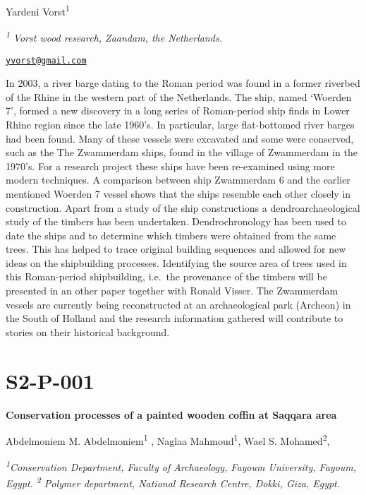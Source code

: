 \documentclass[
]{book}
\begin{document}
Yardeni Vorst\textsuperscript{1}

\textsuperscript{\emph{1}} \emph{Vorst wood research, Zaandam, the Netherlands.}

\href{mailto:yvorst@gmail.com}{\nolinkurl{yvorst@gmail.com}}

In 2003, a river barge dating to the Roman period was found in a former riverbed of the Rhine in the western part of the Netherlands. The ship, named `Woerden 7', formed a new discovery in a long series of Roman-period ship finds in Lower Rhine region since the late 1960's. In particular, large flat-bottomed river barges had been found. Many of these vessels were excavated and some were conserved, such as the The Zwammerdam ships, found in the village of Zwammerdam in the 1970's. For a research project these ships have been re-examined using more modern techniques. A comparison between ship Zwammerdam 6 and the earlier mentioned Woerden 7 vessel shows that the ships resemble each other closely in construction. Apart from a study of the ship constructions a dendroarchaeological study of the timbers has been undertaken. Dendrochronology has been used to date the ships and to determine which timbers were obtained from the same trees. This has helped to trace original building sequences and allowed for new ideas on the shipbuilding processes. Identifying the source area of trees used in this Roman-period shipbuilding, i.e.~the provenance of the timbers will be presented in an other paper together with Ronald Visser. The Zwammerdam vessels are currently being reconstructed at an archaeological park (Archeon) in the South of Holland and the research information gathered will contribute to stories on their historical background.

\hypertarget{s2-p-001}{%
\section*{S2-P-001}\label{s2-p-001}}

\textbf{Conservation processes of a painted wooden coffin at Saqqara area}

Abdelmoniem M. Abdelmoniem\textsuperscript{1} , Naglaa Mahmoud\textsuperscript{1}, Wael S. Mohamed\textsuperscript{2},

\textsuperscript{\emph{1}}\emph{Conservation Department, Faculty of Archaeology, Fayoum University, Fayoum, Egypt. \textsuperscript{2} Polymer department, National Research Centre, Dokki, Giza, Egypt.}
\end{document}
